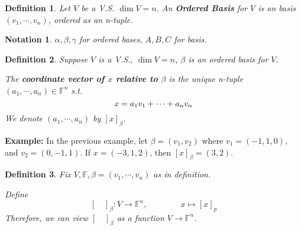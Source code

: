 \documentclass[12pt]{article}
\theoremstyle{plain}
\newtheorem{definition}{Definition}[subsection]
\newtheorem{notation}{Notation}[subsection]
\newcommand{\mF}{{\mathbb{F}}}
\begin{document}
	\begin{definition}
		Let $V$ be a V.S. $\dim V = n$. An \textbf{Ordered Basis} for $V$ is an
		basis $(v_1, \cdots, v_n)$, ordered as an n-tuple. \\
	\end{definition}

	\begin{notation}
		$\alpha,\beta,\gamma$ for ordered bases, $A, B, C$ for basis. \\
	\end{notation}

	\begin{definition}
		Suppose $V$ is a V.S., $\dim V = n$, $\beta$ is an ordered basis for 
		$V$. 

		The \textbf{coordinate vector of $x$ relative to $\beta$}
		is the unique n-tuple $(a_1,\cdots, a_n) \in \mF^n$ s.t. 
		\[
			x = a_1v_1+\cdots+a_nv_n\\
		\]
		We denote $(a_1, \cdots, a_n)$ by $[x]_{\beta}$. \\
	\end{definition}

	{\color{Brown}
		\textbf{Example: }
		In the previous example, let $\beta = (v_1, v_2)$ where
		$v_1 = (-1, 1, 0)$, and $v_2 = (0, -1, 1)$. If $x = (-3, 1, 2)$, then 
		$[x]_{\beta} =(3,2)$. \\
	}

	\begin{definition}
		Fix $V, \mF, \beta = (v_1, \cdots, v_n)$ as in definition. 

		Define 
		\[
			[ \quad ]_{\beta} : V \to \mF^n, \qquad \qquad x \mapsto [x]_p
		\]
		Therefore, we can view $[\quad]_{\beta}$ as a function $V \to \mF^n$.\\
	\end{definition}
\end{document}
